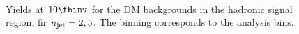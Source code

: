 \begin{figure}[]
{  }~~
  \caption{\label{fig:ewkYields1} Yields at $10\fbinv$ for the DM backgrounds in the
  hadronic signal region, fir $n_{\text{jet}}=2,5$. The binning corresponds to the analysis  bins. }
\end{figure}


